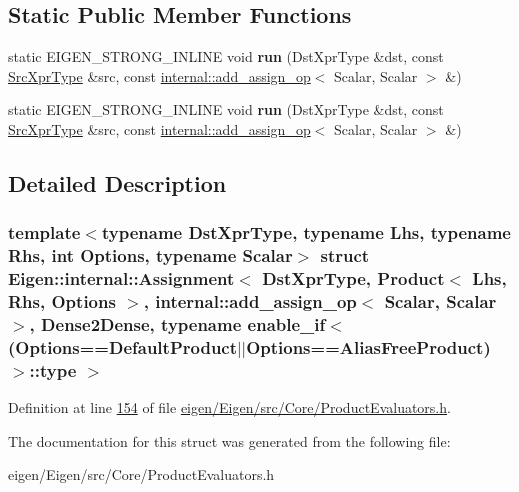 \subsection*{Static Public Member Functions}
\begin{DoxyCompactItemize}
\item 
\mbox{\label{struct_eigen_1_1internal_1_1_assignment_3_01_dst_xpr_type_00_01_product_3_01_lhs_00_01_rhs_00_01fcb8254334c8007b54d75ff97f0106b6_a8f6e4fb3a8ecf6c1c13d7223468b5bb7}} 
static E\+I\+G\+E\+N\+\_\+\+S\+T\+R\+O\+N\+G\+\_\+\+I\+N\+L\+I\+NE void {\bfseries run} (Dst\+Xpr\+Type \&dst, const \hyperlink{group___core___module_class_eigen_1_1_product}{Src\+Xpr\+Type} \&src, const \hyperlink{struct_eigen_1_1internal_1_1add__assign__op}{internal\+::add\+\_\+assign\+\_\+op}$<$ Scalar, Scalar $>$ \&)
\item 
\mbox{\label{struct_eigen_1_1internal_1_1_assignment_3_01_dst_xpr_type_00_01_product_3_01_lhs_00_01_rhs_00_01fcb8254334c8007b54d75ff97f0106b6_a8f6e4fb3a8ecf6c1c13d7223468b5bb7}} 
static E\+I\+G\+E\+N\+\_\+\+S\+T\+R\+O\+N\+G\+\_\+\+I\+N\+L\+I\+NE void {\bfseries run} (Dst\+Xpr\+Type \&dst, const \hyperlink{group___core___module_class_eigen_1_1_product}{Src\+Xpr\+Type} \&src, const \hyperlink{struct_eigen_1_1internal_1_1add__assign__op}{internal\+::add\+\_\+assign\+\_\+op}$<$ Scalar, Scalar $>$ \&)
\end{DoxyCompactItemize}


\subsection{Detailed Description}
\subsubsection*{template$<$typename Dst\+Xpr\+Type, typename Lhs, typename Rhs, int Options, typename Scalar$>$\newline
struct Eigen\+::internal\+::\+Assignment$<$ Dst\+Xpr\+Type, Product$<$ Lhs, Rhs, Options $>$, internal\+::add\+\_\+assign\+\_\+op$<$ Scalar, Scalar $>$, Dense2\+Dense, typename enable\+\_\+if$<$(\+Options==\+Default\+Product$\vert$$\vert$\+Options==\+Alias\+Free\+Product)$>$\+::type $>$}



Definition at line \hyperlink{eigen_2_eigen_2src_2_core_2_product_evaluators_8h_source_l00154}{154} of file \hyperlink{eigen_2_eigen_2src_2_core_2_product_evaluators_8h_source}{eigen/\+Eigen/src/\+Core/\+Product\+Evaluators.\+h}.



The documentation for this struct was generated from the following file\+:\begin{DoxyCompactItemize}
\item 
eigen/\+Eigen/src/\+Core/\+Product\+Evaluators.\+h\end{DoxyCompactItemize}
